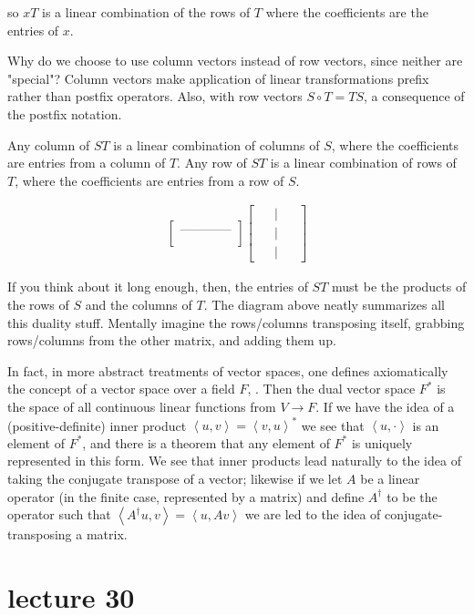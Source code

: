 \documentclass{article}
\begin{document}
so $xT$ is a linear combination of the rows of $T$ where the coefficients are the entries of $x$. 

Why do we choose to use column vectors instead of row vectors, since neither are "special"? Column vectors make application of linear transformations prefix rather than postfix operators. Also, with row vectors $S \circ T = TS$, a consequence of the postfix notation.

Any column of $ST$ is a linear combination of columns of $S$, where the coefficients are entries from a column of $T$. Any row of $ST$ is a linear combination of rows of $T$, where the coefficients are entries from a row of $S$. 

\begin{align}
\begin{bmatrix}
\\
\mbox{------------}\\
\\
\end{bmatrix}
\begin{bmatrix}
\ \ & \big| &\ \ \\
\ \ & \big| &\ \ \\
\ \ & \big| &\ \ 
\end{bmatrix}
\end{align}

If you think about it long enough, then, the entries of $ST$ must be the products of the rows of $S$ and the columns of $T$. The diagram above neatly summarizes all this duality stuff. Mentally imagine the rows/columns transposing itself, grabbing rows/columns from the other matrix, and adding them up.

In fact, in more abstract treatments of vector spaces, one defines axiomatically the concept of a vector space over a field $F$, . Then the dual vector space $F^*$ is the space of all continuous linear functions from $V \rightarrow F$. If we have the idea of a (positive-definite) inner product $\left<u,v\right> = \left<v,u\right>^*$ we see that $\left<u,\cdot\right>$ is an element of $F^*$, and there is a theorem that any element of $F^*$ is uniquely represented in this form. We see that inner products lead naturally to the idea of taking the conjugate transpose of a vector; likewise if we let $A$ be a linear operator (in the finite case, represented by a matrix) and define $A^\dagger$ to be the operator such that $\left<A^\dagger u, v\right>= \left<u, Av\right>$ we are led to the idea of conjugate-transposing a matrix.

\section{lecture 30}
\end{document}

